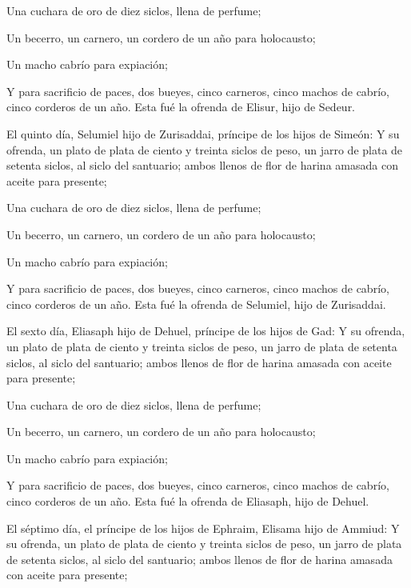  Una cuchara de oro de diez siclos, llena de perfume;

 Un becerro, un carnero, un cordero de un año para
holocausto;

 Un macho cabrío para expiación;

 Y para sacrificio de paces, dos bueyes, cinco carneros,
cinco machos de cabrío, cinco corderos de un año. Esta fué la ofrenda de
Elisur, hijo de Sedeur.

 El quinto día, Selumiel hijo de Zurisaddai, príncipe de
los hijos de Simeón:  Y su ofrenda, un plato de plata de
ciento y treinta siclos de peso, un jarro de plata de setenta siclos, al
siclo del santuario; ambos llenos de flor de harina amasada con aceite
para presente;

 Una cuchara de oro de diez siclos, llena de perfume;

 Un becerro, un carnero, un cordero de un año para
holocausto;

 Un macho cabrío para expiación;

 Y para sacrificio de paces, dos bueyes, cinco carneros,
cinco machos de cabrío, cinco corderos de un año. Esta fué la ofrenda de
Selumiel, hijo de Zurisaddai.

 El sexto día, Eliasaph hijo de Dehuel, príncipe de los
hijos de Gad:  Y su ofrenda, un plato de plata de ciento
y treinta siclos de peso, un jarro de plata de setenta siclos, al siclo
del santuario; ambos llenos de flor de harina amasada con aceite para
presente;

 Una cuchara de oro de diez siclos, llena de perfume;

 Un becerro, un carnero, un cordero de un año para
holocausto;

 Un macho cabrío para expiación;

 Y para sacrificio de paces, dos bueyes, cinco carneros,
cinco machos de cabrío, cinco corderos de un año. Esta fué la ofrenda de
Eliasaph, hijo de Dehuel.

 El séptimo día, el príncipe de los hijos de Ephraim,
Elisama hijo de Ammiud:  Y su ofrenda, un plato de plata
de ciento y treinta siclos de peso, un jarro de plata de setenta siclos,
al siclo del santuario; ambos llenos de flor de harina amasada con
aceite para presente;

